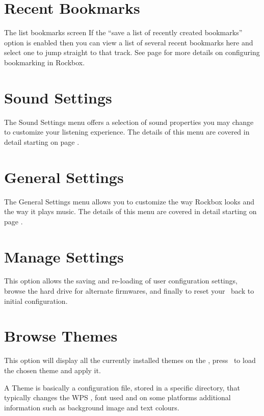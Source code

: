 \section {Recent Bookmarks}
%
  {The list bookmarks screen}{}
If the ``save a list of recently created bookmarks'' option is enabled 
then you can view a list of several recent bookmarks here and select one to 
jump straight to that track. See page \pageref{ref:Bookmarkconfigactual} 
for more details on configuring bookmarking in Rockbox.

\section{Sound Settings}
The Sound Settings menu offers a selection of sound properties you may 
change to customize your listening experience.  The details of this menu are 
covered in detail starting on page \pageref{ref:configure_rockbox_sound}. 

\section{General Settings}
The General Settings menu allows you to customize the way Rockbox looks and 
the way it plays music.  The details of this menu are covered in detail 
starting on page \pageref{ref:configure_rockbox_general}.

\section{Manage Settings}
This option allows the saving and re-loading of user configuration settings, 
browse the hard drive for alternate firmwares, and finally to reset your 
\dap\ back to initial configuration.

\section{Browse Themes}
This option will display all the currently installed themes on the \dap, 
press \ButtonRight\ to load the chosen theme and apply it.

A Theme is basically a configuration file, stored in a specific directory, 
that typically changes the WPS 
, font used and on some platforms
additional information such as background image and text colours.

